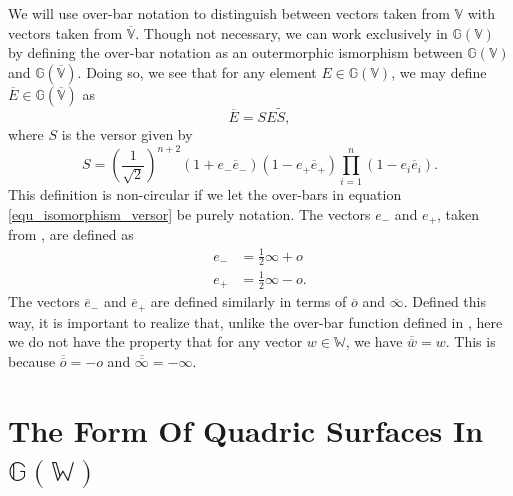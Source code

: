 \documentclass{birkjour}
\theoremstyle{definition}
\theoremstyle{remark}
\numberwithin{equation}{section}
\newcommand{\G}{\mathbb{G}}
\newcommand{\V}{\mathbb{V}}
\newcommand{\Vb}{\mathbb{\overline{V}}}
\newcommand{\W}{\mathbb{W}}
\newcommand{\nvao}{o}
\newcommand{\nvai}{\infty}
\newcommand{\nvaob}{\overline{o}}
\newcommand{\nvaib}{\overline{\infty}}
\newcommand{\eminus}{e_{-}}
\newcommand{\eplus}{e_{+}}
\newcommand{\eminusb}{\overline{e}_{-}}
\newcommand{\eplusb}{\overline{e}_{+}}
\begin{document}
We will use over-bar notation to distinguish between vectors taken from $\V$
with vectors taken from $\Vb$.  Though not necessary, we can work exclusively
in $\G(\V)$ by defining the over-bar notation as an outermorphic ismorphism between
$\G(\V)$ and $\G(\Vb)$.  Doing so, we see that for any element $E\in\G(\V)$,
we may define $\overline{E}\in\G(\Vb)$ as
\begin{equation}
\overline{E} = SE\tilde{S},
\end{equation}
where $S$ is the versor given by
\begin{equation}\label{equ_isomorphism_versor}
S = \left(\frac{1}{\sqrt{2}}\right)^{n+2}(1+\eminus\eminusb)(1-\eplus\eplusb)\prod_{i=1}^n(1-e_i\overline{e}_i).
\end{equation}
This definition is non-circular if we let the over-bars in equation \eqref{equ_isomorphism_versor}
be purely notation.  The vectors $\eminus$ and $\eplus$, taken from \cite{LiRockwood},
are defined as
\begin{align}
\eminus &= \frac{1}{2}\nvai + \nvao \\
\eplus &= \frac{1}{2}\nvai - \nvao.
\end{align}
The vectors $\eminusb$ and $\eplusb$ are defined similarly in terms of $\nvaob$ and $\nvaib$.
Defined this way, it is important to realize that, unlike the over-bar function defined in \cite{Parkin12},
here we do not have the property that for any vector $w\in\W$, we have $\overline{\overline{w}}=w$.
This is because $\overline{\nvaob}=-\nvao$ and $\overline{\nvaib}=-\nvai$.

\section{The Form Of Quadric Surfaces In $\G(\W)$}
\end{document}
